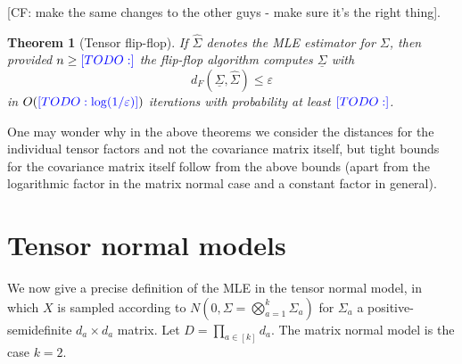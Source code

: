 \documentclass{article}
\newtheorem{theorem}{Theorem}
\newcommand\eps{\varepsilon}
\newcommand{\CF}[1]{{\color{purple}[CF: #1]}}
\newcommand{\TODO}[1]{{\color{blue}[TODO: #1]}}
\begin{document}
\CF{make the same changes to the other guys - make sure it's the right thing}.

\begin{theorem}[Tensor flip-flop]\label{thm:tensor-flipflop} If $\hat{\Sigma}$ denotes the MLE estimator for $\Sigma$, then provided $n \geq \TODO{}$ the flip-flop algorithm computes $\underline{\Sigma}$ with 
$$ d_F(\underline{\Sigma}, \hat{\Sigma}) \leq \eps $$
in $O(\TODO{\log(1/\eps)})$ iterations with probability at least $\TODO{}$.
\end{theorem}
One may wonder why in the above theorems we consider the distances for the individual tensor factors and not the covariance matrix itself, but tight bounds for the covariance matrix itself follow from the above bounds (apart from the logarithmic factor in the matrix normal case and a constant factor in general).


\section{Tensor normal models}
We now give a precise definition of the MLE in the tensor normal model, in which $X$ is sampled according to $N(0, \Sigma = \bigotimes_{a = 1}^{k} \Sigma_a)$ for $\Sigma_a$ a positive-semidefinite $d_a\times d_a$ matrix. Let $D = \prod_{a \in [k]} d_a$. The matrix normal model is the case $k = 2$. 
\end{document}
